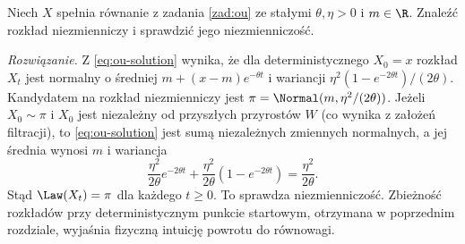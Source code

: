 \begin{zadanie}
Niech $X$ spełnia równanie z zadania \ref{zad:ou}
ze stałymi $\theta,\eta>0$ i $m\in\R$.
Znaleźć rozkład niezmienniczy i sprawdzić jego
niezmienniczość.

\emph{Rozwiązanie.} Z \eqref{eq:ou-solution}
wynika, że dla deterministycznego $X_0=x$ rozkład
$X_t$ jest normalny o średniej
$m+(x-m)e^{-\theta t}$ i wariancji
$\eta^2(1-e^{-2\theta t})/(2\theta)$.
Kandydatem na rozkład niezmienniczy jest
$\pi=\Normal(m,\eta^2/(2\theta))$.
Jeżeli $X_0\sim\pi$ i $X_0$ jest niezależny od
przyszłych przyrostów $W$ (co wynika z założeń
filtracji), to \eqref{eq:ou-solution} jest sumą
niezależnych zmiennych normalnych, a jej średnia
wynosi $m$ i wariancja
\[
\frac{\eta^2}{2\theta}e^{-2\theta t}
+\frac{\eta^2}{2\theta}(1-e^{-2\theta t})
=\frac{\eta^2}{2\theta}.
\]
Stąd $\Law(X_t)=\pi$ dla każdego $t\ge0$.
To sprawdza niezmienniczość. Zbieżność rozkładów
przy deterministycznym punkcie startowym, otrzymana
w poprzednim rozdziale, wyjaśnia fizyczną intuicję
powrotu do równowagi.
\end{zadanie}

